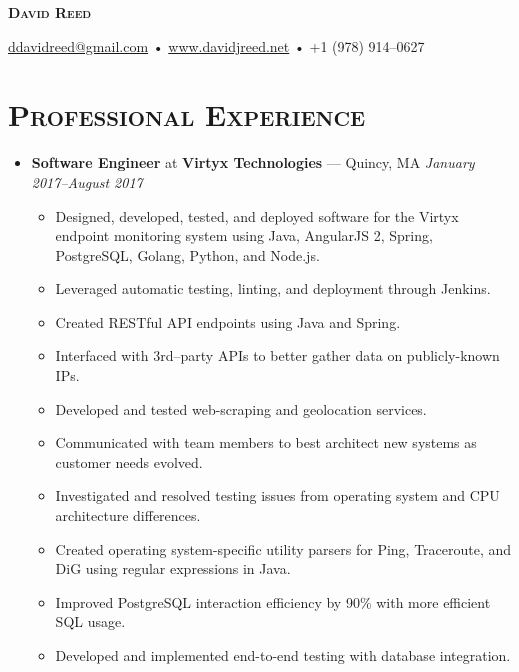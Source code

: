 \documentclass[11pt]{article}
\begin{document}
\thispagestyle{empty}

\begin{center}
  {\LARGE\textsc{\textbf{David Reed}}}
\end{center}
\begin{center}
  \href{mailto:ddavidreed@gmail.com}{ddavidreed@gmail.com} • \href{http://www.davidjreed.net/}{www.davidjreed.net} • +1 (978) 914--0627 \\
  \hrulefill
\end{center}



\section*{\textsc{Professional Experience}}
\begin{itemize}
\item \textbf{Software Engineer} at \textbf{Virtyx Technologies} --- Quincy, MA \hfill {\em January 2017--August 2017}
  \begin{itemize}
  \item Designed, developed, tested, and deployed software for the Virtyx endpoint monitoring system using Java, AngularJS 2, Spring, PostgreSQL, Golang, Python, and Node.js.
  \item Leveraged automatic testing, linting, and deployment through Jenkins.
  \item Created RESTful API endpoints using Java and Spring.
  \item Interfaced with 3rd--party APIs to better gather data on publicly-known IPs.
  \item Developed and tested web-scraping and geolocation services.
  \item Communicated with team members to best architect new systems as customer needs evolved.
  \item Investigated and resolved testing issues from operating system and CPU architecture differences.
  \item Created operating system-specific utility parsers for Ping, Traceroute, and DiG using regular expressions in Java.
  \item Improved PostgreSQL interaction efficiency by 90\% with more efficient SQL usage.
  \item Developed and implemented end-to-end testing with database integration.
  \end{itemize}
\end{itemize}
\end{document}
